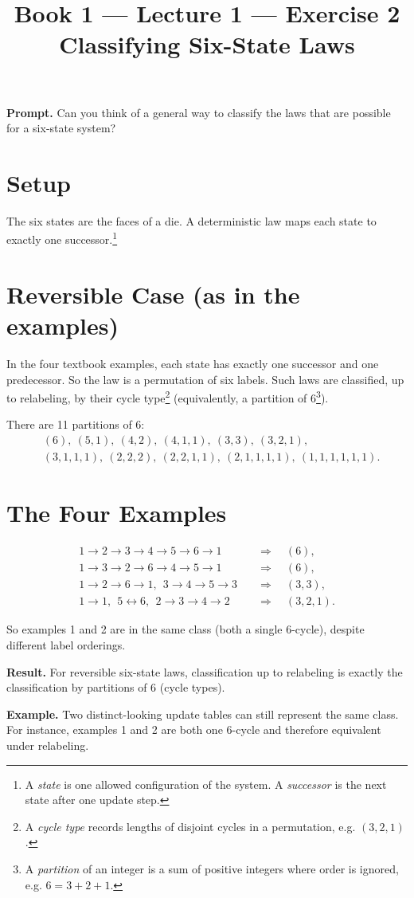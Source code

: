 \documentclass[11pt]{article}
\title{\textbf{Book 1 --- Lecture 1 --- Exercise 2}\\[2mm]
\large Classifying Six-State Laws}
\author{}
\date{}
\newcommand{\promptbox}[1]{%
  \begingroup\setlength{\fboxsep}{10pt}\noindent
  \colorbox{blue!8}{\parbox{\dimexpr\linewidth-2\fboxsep\relax}{\textbf{Prompt. }#1}}
  \endgroup
}
\newcommand{\resultbox}[1]{%
  \begingroup\setlength{\fboxsep}{10pt}\noindent
  \colorbox{purple!8}{\parbox{\dimexpr\linewidth-2\fboxsep\relax}{\textbf{Result. }#1}}
  \endgroup
}
\newcommand{\examplebox}[1]{%
  \begingroup\setlength{\fboxsep}{10pt}\noindent
  \colorbox{green!8}{\parbox{\dimexpr\linewidth-2\fboxsep\relax}{\textbf{Example. }#1}}
  \endgroup
}
\begin{document}
\maketitle

\promptbox{Can you think of a general way to classify the laws that are possible
for a six-state system?}

\section*{Setup}
The six states are the faces of a die. A deterministic law maps each state to
exactly one successor.\footnote{A \emph{state} is one allowed configuration of
the system. A \emph{successor} is the next state after one update step.}

\section*{Reversible Case (as in the examples)}
In the four textbook examples, each state has exactly one successor and one
predecessor. So the law is a permutation of six labels. Such laws are
classified, up to relabeling, by their cycle type\footnote{A \emph{cycle type}
records lengths of disjoint cycles in a permutation, e.g. \((3,2,1)\).}
(equivalently, a partition of
6\footnote{A \emph{partition} of an integer is a sum of positive integers where
order is ignored, e.g. \(6=3+2+1\).}).

There are 11 partitions of 6:
\[
\begin{aligned}
&(6),\ (5,1),\ (4,2),\ (4,1,1),\ (3,3),\ (3,2,1),\\
&(3,1,1,1),\ (2,2,2),\ (2,2,1,1),\ (2,1,1,1,1),\ (1,1,1,1,1,1).
\end{aligned}
\]

\section*{The Four Examples}
\[
\begin{aligned}
1\to2\to3\to4\to5\to6\to1 &\quad\Rightarrow\quad (6),\\
1\to3\to2\to6\to4\to5\to1 &\quad\Rightarrow\quad (6),\\
1\to2\to6\to1,\ \ 3\to4\to5\to3 &\quad\Rightarrow\quad (3,3),\\
1\to1,\ \ 5\leftrightarrow6,\ \ 2\to3\to4\to2 &\quad\Rightarrow\quad (3,2,1).
\end{aligned}
\]

So examples 1 and 2 are in the same class (both a single 6-cycle), despite
different label orderings.

\resultbox{For reversible six-state laws, classification up to relabeling is
exactly the classification by partitions of 6 (cycle types).}

\examplebox{Two distinct-looking update tables can still represent the same
class. For instance, examples 1 and 2 are both one 6-cycle and therefore
equivalent under relabeling.}
\end{document}
